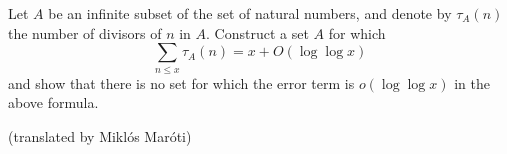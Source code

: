 Let $A$ be an infinite subset of the set of natural numbers, and denote by $\tau_A(n)$ the number of divisors of $n$ in $A$. Construct a set $A$ for which
$$\sum_{n\le x}\tau_A(n)=x+O(\log\log x)$$and show that there is no set for which the error term is $o(\log\log x)$ in the above formula.

(translated by Miklós Maróti)
